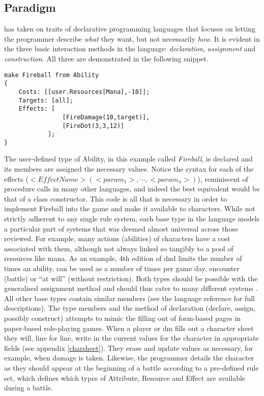 \subsection{Paradigm}
\label{language:paradigm}
\langname{} has taken on traits of declarative programming languages that focuses on letting the programmer describe \emph{what} they want, but not necessarily \emph{how}. It is evident in the three basic interaction methods in the language: \emph{declaration}, \emph{assignment} and \emph{construction}. All three are demonstrated in the following snippet. 

\begin{lstlisting}[language=fflang]
make Fireball from Ability
{
	Costs: [[user.Resources[Mana],-10]];
	Targets: [all];
	Effects: [
				[FireDamage(10,target)],
				[FireDot(3,3,12)]
			];
}
\end{lstlisting}

The user-defined type of Ability, in this example called \emph{Fireball}, is declared and its members are assigned the necessary values. Notice the syntax for each of the effects ($<EffectName>(<param_1>, \cdots ,<param_n>)$), reminiscent of procedure calls in many other languages, and indeed the best equivalent would be that of a class constructor. This code is all that is necessary in order to implement Fireball into the game and make it available to characters.
While not strictly adherent to any single rule system, each base type in the language models a particular part of systems that was deemed almost universal across those reviewed. For example, many actions (abilities) of characters have a cost associated with them, although not always linked so tangibly to a pool of resources like mana.
As an example, 4th edition of \ac{dnd} limits the number of times an ability, can be used as a number of times per game day, encounter (battle) or ``at will'' (without restriction). Both types should be possible with the generalised assignment method and should thus cater to many different systems . All other base types contain similar members (see the language reference for full descriptions).
The type members and the method of declaration (declare, assign, possibly construct) attempts to mimic the filling out of form-based pages in paper-based role-playing games. When a player or \ac{dm} fills out a character sheet they will, line for line, write in the current values for the character in appropriate fields (see appendix \vref{charsheet}). They erase and update values as necessary, for example, when damage is taken.
Likewise, the programmer details the character as they should appear at the beginning of a battle according to a pre-defined rule set, which defines which types of Attribute, Resource and Effect are available during a battle.
